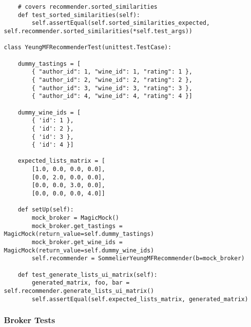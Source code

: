 \begin{verbatim}
    # covers recommender.sorted_similarities
    def test_sorted_similarities(self):
        self.assertEqual(self.sorted_similarities_expected, self.recommender.sorted_similarities(*self.test_args))

class YeungMFRecommenderTest(unittest.TestCase):

    dummy_tastings = [
        { "author_id": 1, "wine_id": 1, "rating": 1 },
        { "author_id": 2, "wine_id": 2, "rating": 2 },
        { "author_id": 3, "wine_id": 3, "rating": 3 },
        { "author_id": 4, "wine_id": 4, "rating": 4 }]

    dummy_wine_ids = [
        { 'id': 1 },
        { 'id': 2 },
        { 'id': 3 },
        { 'id': 4 }]

    expected_lists_matrix = [
        [1.0, 0.0, 0.0, 0.0],
        [0.0, 2.0, 0.0, 0.0],
        [0.0, 0.0, 3.0, 0.0],
        [0.0, 0.0, 0.0, 4.0]]

    def setUp(self):
        mock_broker = MagicMock()
        mock_broker.get_tastings = MagicMock(return_value=self.dummy_tastings)
        mock_broker.get_wine_ids = MagicMock(return_value=self.dummy_wine_ids)
        self.recommender = SommelierYeungMFRecommender(b=mock_broker)
 
    def test_generate_lists_ui_matrix(self):
        generated_matrix, foo, bar = self.recommender.generate_lists_ui_matrix()
        self.assertEqual(self.expected_lists_matrix, generated_matrix)

\end{verbatim}

\subsubsection{Broker Tests}

